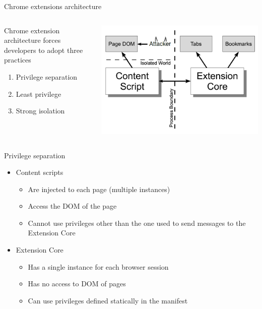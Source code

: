 \documentclass[11pt]{beamer}
\begin{document}

\begin{frame}{Chrome extensions architecture}
\begin{columns}[T]
\begin{column}{.48\textwidth}
Chrome extension architecture forces developers to adopt three practices
\begin{enumerate}
\item Privilege separation
\item Least privilege
\item Strong isolation
\end{enumerate}
\end{column}%
\begin{column}{.48\textwidth}
\includegraphics[scale=0.25]{Images/StrongIsolation.png}
\end{column}%
\end{columns}
\end{frame}

\begin{frame}{Privilege separation}
\begin{itemize}
\item Content scripts
\begin{itemize}
\item Are injected to each page (multiple instances)
\item Access the DOM of the page
\item Cannot use privileges other than the one used to send messages to the Extension Core
\end{itemize}
\item Extension Core
\begin{itemize}
\item Has a single instance for each browser session
\item Has no access to DOM of pages
\item Can use privileges defined statically in the manifest
\end{itemize}
\end{itemize}
\end{frame}
\end{document}
